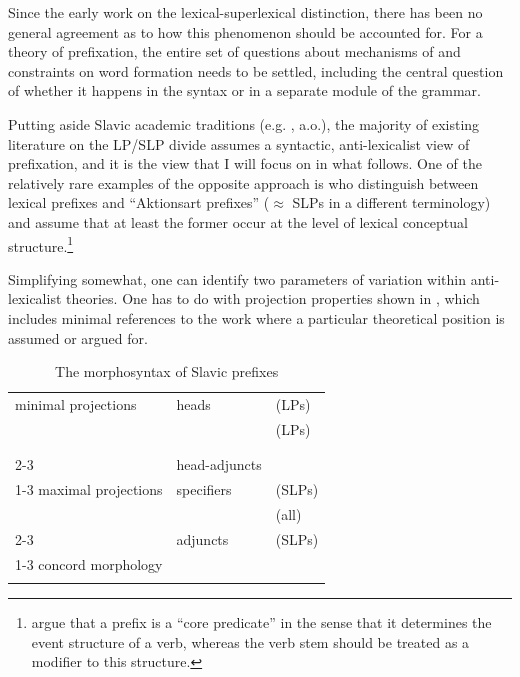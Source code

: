 \documentclass[output=paper,colorlinks,citecolor=brown]{langscibook}
\begin{document}
Since the early work on the lexical-superlexical distinction, there has been no general agreement as to how this phenomenon should be accounted for. For a theory of prefixation, the entire set of questions about mechanisms of and constraints on word formation needs to be settled, including the central question of whether it happens in the syntax or in a separate module of the grammar. 

Putting aside Slavic academic traditions (e.g. \citealt{Svedova1980, Grzegorczykowa.Laskowski.Wrobel1998, Sticha2018}, a.o.), the majority of existing literature on the LP/SLP divide assumes a syntactic, anti-lexicalist view of prefixation, and it is the view that I will focus on in what follows. One of the relatively rare examples of the opposite approach is \citet{Spencer.Zaretskaya1998} who distinguish between lexical prefixes and “Aktionsart prefixes” (${\approx}$ SLPs in a different terminology) and assume that at least the former occur at the level of lexical conceptual structure.\footnote{\citet{Spencer.Zaretskaya1998} argue that a prefix is a “core predicate” in the sense that it determines the event structure of a verb, whereas the verb stem should be treated as a modifier to this structure.} 

Simplifying somewhat, one can identify two parameters of variation within anti-lexicalist theories. One has to do with projection properties shown in , which includes minimal references to the work where a particular theoretical position  is assumed or argued for.

\begin{table}
    \centering
    \begin{tabularx}{.85\textwidth}{lll}
    \lsptoprule
    minimal projections & heads & \citet{Svenonius2004} (LPs) \\
    && \citet{Slabakova2005} (LPs)\\
    && \citet{Zaucer2009}\\
    && \citet{Biskup2019}\\\cmidrule(lr){2-3}
    & head-adjuncts & \citet{BabkoMalaya1999}\\\cmidrule(lr){1-3}
    maximal projections & specifiers &\citet{Svenonius2004} (SLPs)\\
    &&\citet{Svenonius2008} (all)\\\cmidrule(lr){2-3}
    & adjuncts & \citet{Slabakova2005} (SLPs)\\\cmidrule(lr){1-3}
    concord morphology & &  \citet{Arsenijevic2012}
    \\\lspbottomrule
    \end{tabularx}
    \caption{The morphosyntax of Slavic prefixes}
    \label{tab:1}
\end{table}
\end{document}
